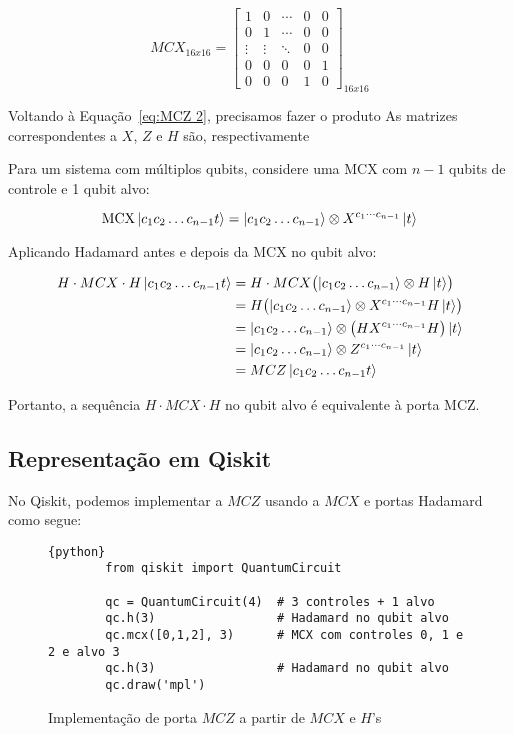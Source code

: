 \begin{equation}
    MCX_{16x16} =
    \begin{bmatrix}
        1 & 0 & \cdots & 0 & 0 \\
        0 & 1 & \cdots & 0 & 0 \\
        \vdots & \vdots & \ddots & 0 & 0 \\
        0 & 0 & 0 & 0 & 1 \\
        0 & 0 & 0 & 1 & 0 
    \end{bmatrix}
    _{16x16}
\end{equation}

Voltando à Equação~\ref{eq:MCZ 2}, precisamos fazer o produto
As matrizes correspondentes a $X$, $Z$ e $H$ são, respectivamente

Para um sistema com múltiplos qubits, considere uma MCX com \(n-1\) qubits de controle e 1 qubit alvo:

\begin{equation}
    \text{MCX}\ket{c_1 c_2 \dots c_{n-1} t} = \ket{c_1 c_2 \dots c_{n-1}} \otimes X^{c_1 \cdots c_{n-1}}\ket{t}
\end{equation}

Aplicando Hadamard antes e depois da MCX no qubit alvo:

\begin{align*}
    H \cdot MCX \cdot H \ket{c_1 c_2 \dots c_{n-1} t} 
    &= H \cdot MCX \bigl( \ket{c_1 c_2 \dots c_{n-1}} \otimes H\ket{t} \bigr) \\
    &= H \bigl( \ket{c_1 c_2 \dots c_{n-1}} \otimes X^{c_1 \cdots c_{n-1}} H\ket{t} \bigr) \\
    &= \ket{c_1 c_2 \dots c_{n-1}} \otimes \bigl( H X^{c_1 \cdots c_{n-1}} H \bigr) \ket{t} \\
    &= \ket{c_1 c_2 \dots c_{n-1}} \otimes Z^{c_1 \cdots c_{n-1}} \ket{t} \\
    &= MCZ \ket{c_1 c_2 \dots c_{n-1} t}
\end{align*}

Portanto, a sequência \(H \cdot MCX \cdot H\) no qubit alvo é equivalente à porta MCZ.

\subsection*{Representação em Qiskit}

No Qiskit, podemos implementar a $MCZ$ usando a $MCX$ e portas Hadamard como segue:
\begin{figure}
    \centering
    \caption{Implementação de porta $MCZ$ a partir de $MCX$ e $H$'s}
    \label{cod:apendiceC}
    \begin{lstlisting}{python}
        from qiskit import QuantumCircuit
        
        qc = QuantumCircuit(4)  # 3 controles + 1 alvo
        qc.h(3)                 # Hadamard no qubit alvo
        qc.mcx([0,1,2], 3)      # MCX com controles 0, 1 e 2 e alvo 3
        qc.h(3)                 # Hadamard no qubit alvo
        qc.draw('mpl')
    \end{lstlisting}
\end{figure}
